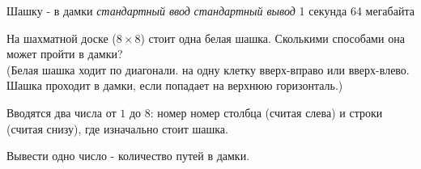 \begin{problem}%
{Шашку - в дамки}%
{\textsl{стандартный ввод}}%
{\textsl{стандартный вывод}}%
{1 секунда}%
{64 мегабайта}%
{}

На шахматной доске ($8 \times 8$) стоит одна белая шашка. Сколькими способами она может пройти в дамки?\\

(Белая шашка ходит по диагонали. на одну клетку вверх-вправо или вверх-влево. Шашка проходит в дамки, если попадает на верхнюю горизонталь.)

\InputFile

Вводятся два числа от $1$ до $8$: номер номер столбца (считая слева) и строки (считая снизу), где изначально стоит шашка.

\OutputFile

Вывести одно число - количество путей в дамки.

\Examples

\begin{example}
%
%
%
\end{example}
\end{problem}
